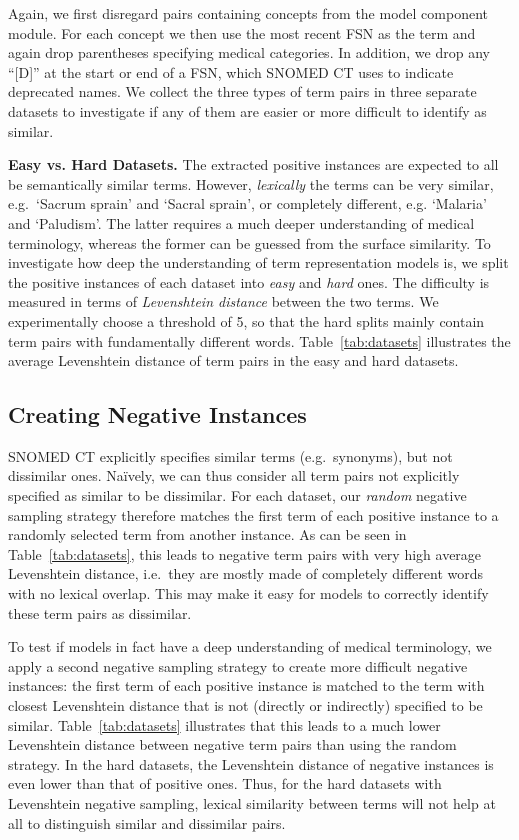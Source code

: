 \documentclass[letterpaper]{article} %
\newcommand{\lab}[1]{`#1'}
\begin{document}
Again, we first disregard pairs containing concepts from the model component module.
For each concept we then use the most recent FSN as the term and again drop parentheses specifying medical categories. In addition, we drop any ``[D]'' at the start or end of a FSN, which SNOMED CT uses to indicate deprecated names.
We collect the three types of term pairs in three separate datasets to investigate if any of them are easier or more difficult to identify as similar.

\noindent \textbf{Easy vs. Hard Datasets.}
The extracted positive instances are expected to all be semantically similar terms. However,  \emph{lexically} the terms can be very similar, e.g.~\lab{Sacrum sprain} and \lab{Sacral sprain}, or completely different, e.g. \lab{Malaria} and \lab{Paludism}.
The latter requires a much deeper understanding of medical terminology, whereas the former can be guessed from the surface similarity.
To investigate how deep the understanding of term representation models is, we split the positive instances of each dataset into \emph{easy} and \emph{hard} ones.
The difficulty is measured in terms of \emph{Levenshtein distance} between the two terms.
We experimentally choose a threshold of 5, so that the hard splits mainly contain term pairs with fundamentally different words.
Table~\ref{tab:datasets} illustrates the average Levenshtein distance of term pairs in the easy and hard datasets.

\subsection{Creating Negative Instances}
SNOMED CT explicitly specifies similar terms (e.g.~synonyms), but not dissimilar ones.
Na\"{i}vely, we can thus consider all term pairs not explicitly specified as similar to be dissimilar.
For each dataset, our \emph{random} negative sampling strategy therefore matches the first term of each positive instance to a randomly selected term from another instance.
As can be seen in Table~\ref{tab:datasets}, this leads to negative term pairs with very high average Levenshtein distance, i.e.~they are mostly made of completely different words with no lexical overlap. This may make it easy for models to correctly identify these term pairs as dissimilar.

To test if models in fact have a deep understanding of medical terminology, we apply a second negative sampling strategy to create more difficult negative instances:
the first term of each positive instance is matched to the term with closest Levenshtein distance that is not (directly or indirectly) specified to be similar.
Table~\ref{tab:datasets} illustrates that this leads to a much lower Levenshtein distance between negative term pairs than using the random strategy. In the hard datasets, the Levenshtein distance of negative instances is even lower than that of positive ones. Thus, for the hard datasets with Levenshtein negative sampling, lexical similarity between terms will not help at all to distinguish similar and dissimilar pairs.
\end{document}
